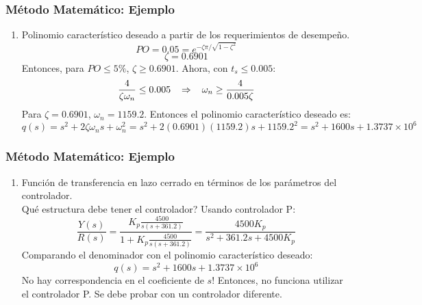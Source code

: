 \documentclass[aspectratio=169]{beamer}
\theoremstyle{definition}
\theoremstyle{plain}
\theoremstyle{remark}
\newcounter{saveenumi}
\newcommand{\seti}{\setcounter{saveenumi}{\value{enumi}}}
\newcommand{\conti}{\setcounter{enumi}{\value{saveenumi}}}
\begin{document}
\begin{frame}[<+->]\frametitle{Método Matemático: Ejemplo}
\begin{enumerate}
	\item Polinomio característico deseado a partir de los requerimientos de desempeño.
	\begin{equation*}
		PO = 0.05 = e^{-\zeta \pi / \sqrt{1-\zeta^2}}
	\end{equation*}
	\begin{equation*}
		\zeta = 0.6901
	\end{equation*}
	Entonces, para $PO \leq 5\%$, $\zeta \geq 0.6901$. Ahora, con $t_s \leq 0.005$:
	\begin{equation*}
		\frac{4}{\zeta \omega_n} \leq 0.005 \hspace*{3mm} \Rightarrow \hspace*{3mm} \omega_n \geq \frac{4}{0.005\zeta}
	\end{equation*}
	Para $\zeta = 0.6901$, $\omega_n = 1159.2$. Entonces el polinomio característico deseado es:
	\begin{equation*}
		q(s) = s^2 + 2 \zeta \omega_n s + \omega_n^2 = s^2 + 2(0.6901)(1159.2)s + 1159.2^2 = s^2 + 1600s +1.3737\times 10^6
	\end{equation*}
	\seti
\end{enumerate}
\end{frame}

\begin{frame}[<+->]\frametitle{Método Matemático: Ejemplo}
\begin{enumerate}
	\conti
	\item Función de transferencia en lazo cerrado en términos de los parámetros del controlador.\\
	Qué estructura debe tener el controlador? Usando controlador P:
	\begin{equation*}
		\frac{Y(s)}{R(s)} = \frac{K_p\frac{4500}{s(s+361.2)}}{1 + K_p\frac{4500}{s(s+361.2)}} = \frac{4500 K_p}{s^2 + 361.2s + 4500K_p}
	\end{equation*}
	Comparando el denominador con el polinomio característico deseado: 
	\begin{equation*}
		q(s) = s^2 + 1600s +1.3737\times 10^6
	\end{equation*}
	No hay correspondencia en el coeficiente de $s$! Entonces, no funciona utilizar el controlador P. Se debe probar con un controlador diferente.
	\seti
\end{enumerate}	
\end{frame}
\end{document}
